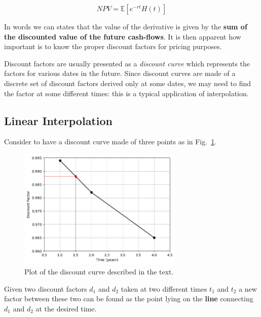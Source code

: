 \begin{equation}
NPV = \mathbb{E}[e^{-rt} H(t)]
\end{equation}

In words we can states that the value of the derivative is given by the \textbf{sum of the discounted value of the future cash-flows}.
It is then apparent how important is to know the proper discount factors for pricing purposes.

Discount factors are usually presented as a \emph{discount curve} which represents the factors for various dates in the future. 
Since discount curves are made of a discrete set of discount factors derived only at some dates, we may need to find the factor at some different times: this is a typical application of interpolation.

\subsection{Linear Interpolation}
\label{linear-interpolation}

Consider to have a discount curve made of three points as in Fig.~\ref{fig:samples_for_interpolation}.

\begin{figure}[htbp]
  \centering
  \includegraphics[width=0.7\textwidth]{figures/interp_example1}
  \caption{Plot of the discount curve described in the text.}
  \label{fig:samples_for_interpolation}
\end{figure}

Given two discount factors $d_1$ and $d_2$ taken at two different times $t_1$ and $t_2$ a new factor between these two can be found as the point lying on the \textbf{line} connecting $d_1$ and $d_2$ at the desired time. 

